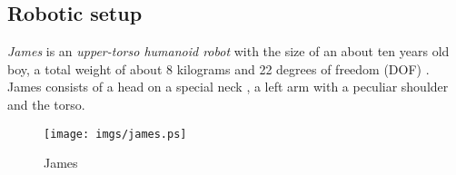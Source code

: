 \subsection{Robotic setup}
\textit{James} is an \textit{upper-torso humanoid robot} with the size of an 
about ten years old boy, a total weight of about 8 kilograms and 22 degrees 
of freedom (DOF) \cite{JHRAUW06-12}. James consists of a head on a special 
neck , a left arm with a peculiar shoulder and the torso.

\begin{figure}
\centering
\texttt{[image: imgs/james.ps]}
\caption{James}
\label{figJames}
\end{figure}

